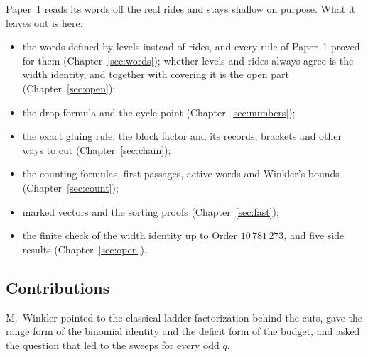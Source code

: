 \documentclass[11pt,a4paper,titlepage]{article}
\begin{document}
Paper~1 reads its words off the real rides and stays shallow on purpose. What it
leaves out is here:
{\samepage
\begin{itemize}
\item the words defined by levels instead of rides, and every rule of Paper~1 proved
  for them (Chapter~\ref{sec:words}); whether levels and rides always agree is the
  width identity, and together with covering it is the open part
  (Chapter~\ref{sec:open});
\item the drop formula and the cycle point (Chapter~\ref{sec:numbers});
\item the exact gluing rule, the block factor and its records, brackets and other ways
  to cut (Chapter~\ref{sec:chain});
\item the counting formulas, first passages, active words and Winkler's bounds
  (Chapter~\ref{sec:count});
\item marked vectors and the sorting proofs (Chapter~\ref{sec:fast});
\item the finite check of the width identity up to Order $10\,781\,273$, and five side
  results (Chapter~\ref{sec:open}).
\end{itemize}}

\subsection*{Contributions}

M.~Winkler pointed to the classical ladder factorization behind the cuts, gave the
range form of the binomial identity and the deficit form of the budget, and asked the
question that led to the sweeps for every odd $q$.

\nopagebreak
\end{document}
